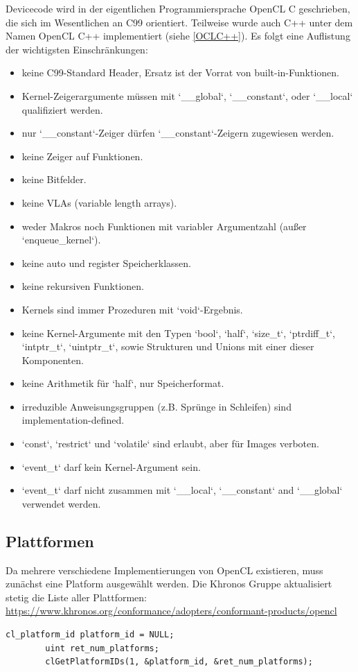 		Devicecode wird in der eigentlichen Programmiersprache OpenCL C geschrieben, die sich im Wesentlichen an C99 orientiert. Teilweise wurde auch C++ unter dem Namen OpenCL C++ implementiert (siehe \ref{OCLC++}). Es folgt eine Auflistung der wichtigsten Einschränkungen:
		\begin{itemize}
	        	\item keine C99-Standard Header, Ersatz ist der Vorrat von built-in-Funktionen.
        		\item Kernel-Zeigerargumente müssen mit \li`__global`, \li`__constant`, oder \li`__local` qualifiziert werden.  
		    \item nur \li`__constant`-Zeiger dürfen \li`__constant`-Zeigern zugewiesen werden.
        		\item keine Zeiger auf Funktionen.
		    \item keine Bitfelder.
        		\item keine VLAs (variable length arrays).
		    \item weder Makros noch Funktionen mit variabler Argumentzahl (außer \li`enqueue_kernel`).
        		\item keine auto und register Speicherklassen.
		    \item keine rekursiven Funktionen.
        		\item \Glspl{Kernel} sind immer Prozeduren mit \li`void`-Ergebnis.
		    \item keine \Gls{Kernel}-Argumente mit den Typen \li`bool`, \li`half`, \li`size_t`, \li`ptrdiff_t`, \li`intptr_t`, \li`uintptr_t`, sowie Strukturen und Unions mit einer dieser Komponenten.
        		\item keine Arithmetik für \li`half`, nur Speicherformat.
		    \item irreduzible Anweisungsgruppen (z.B. Sprünge in Schleifen) sind implementation-defined.
        		\item \li`const`, \li`restrict` und \li`volatile` sind erlaubt, aber für Images verboten.
		    \item \li`event_t` darf kein \Gls{Kernel}-Argument sein.
        		\item  \li`event_t` darf nicht zusammen mit \li`__local`, \li`__constant` and \li`__global` verwendet werden.
		\end{itemize}
		
            \subsection{Plattformen}
            Da mehrere verschiedene Implementierungen von OpenCL existieren, muss zunächst eine \Gls{Platform} ausgewählt werden. Die Khronos Gruppe aktualisiert stetig die Liste aller Plattformen: \url{https://www.khronos.org/conformance/adopters/conformant-products/opencl}
            \begin{lstlisting}[caption=Plattformabfrage]
        cl_platform_id platform_id = NULL;
        uint ret_num_platforms;
        clGetPlatformIDs(1, &platform_id, &ret_num_platforms);
            \end{lstlisting}

